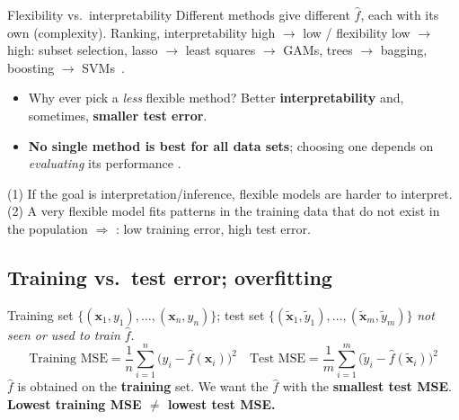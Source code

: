 \begin{topic}{Flexibility vs.\ interpretability }
Different methods give different $\hat f$, each with its own  (complexity). Ranking, interpretability high $\to$ low / flexibility low $\to$ high: subset selection, lasso $\to$ least squares $\to$ GAMs, trees $\to$ bagging, boosting $\to$ SVMs \,.
\begin{itemize}
\item Why ever pick a \emph{less} flexible method? Better \textbf{interpretability} and, sometimes, \textbf{smaller test error}.
\item \textbf{No single method is best for all data sets}; choosing one depends on \emph{evaluating} its performance .
\end{itemize}
\end{topic}

\begin{trap}
(1) If the goal is interpretation/inference, flexible models are harder to interpret. (2) A very flexible model fits patterns in the training data that do not exist in the population $\Rightarrow$ : low training error, high test error.
\end{trap}

\subsection{Training vs.\ test error; overfitting}

\begin{keybox}
Training set $\{(\mathbf x_1,y_1),\dots,(\mathbf x_n,y_n)\}$; test set $\{(\tilde{\mathbf x}_1,\tilde y_1),\dots,(\tilde{\mathbf x}_m,\tilde y_m)\}$ \emph{not seen or used to train} $\hat f$.
\[ \text{Training MSE}=\frac1n\sum_{i=1}^n\big(y_i-\hat f(\mathbf x_i)\big)^2 \quad \text{Test MSE}=\frac1m\sum_{i=1}^m\big(\tilde y_i-\hat f(\tilde{\mathbf x}_i)\big)^2 \]
$\hat f$ is obtained on the \textbf{training} set. We want the $\hat f$ with the \textbf{smallest test MSE}. \textbf{Lowest training MSE $\neq$ lowest test MSE.}
\end{keybox}

